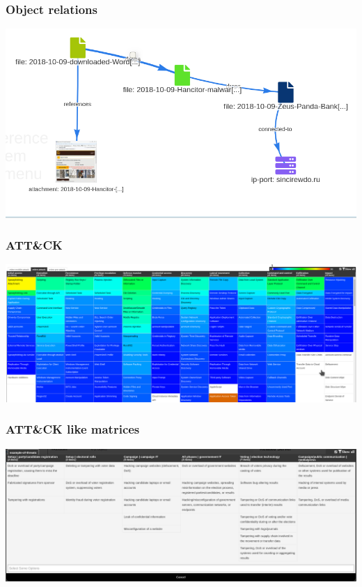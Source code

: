 \begin{frame}
  \frametitle{Object relations}
  \begin{center}
    \includegraphics[width=1.0\linewidth]{story.png}
  \end{center}
\end{frame}


\begin{frame}
  \frametitle{ATT\&CK}
  \begin{center}
    \includegraphics[width=1.0\linewidth]{attack.png}
  \end{center}
\end{frame}

\begin{frame}
  \frametitle{ATT\&CK like matrices}
  \begin{center}
    \includegraphics[width=1.0\linewidth]{attack_like.png}
  \end{center}
\end{frame}

